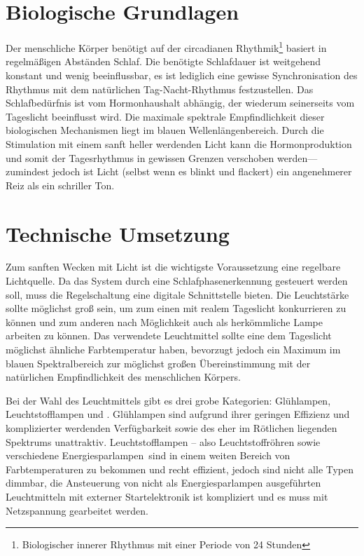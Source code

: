 \documentclass[12pt,a4paper,notitlepage]{article}
\begin{document}
\section{Biologische Grundlagen}
Der menschliche Körper benötigt auf der circadianen Rhythmik\footnote{Biologischer innerer Rhythmus mit einer Periode von 24 Stunden} basiert in regelmäßigen Abständen Schlaf. Die benötigte Schlafdauer ist weitgehend konstant und wenig beeinflussbar, es ist lediglich eine gewisse Synchronisation des Rhythmus mit dem natürlichen Tag-Nacht-Rhythmus festzustellen. Das Schlafbedürfnis ist vom Hormonhaushalt abhängig\cite{WP9}, der wiederum seinerseits vom Tageslicht beeinflusst wird. Die maximale spektrale Empfindlichkeit dieser biologischen Mechanismen liegt im blauen Wellenlängenbereich.
\cite{WP5, WP6, WP7, WP8}
Durch die Stimulation mit einem sanft heller werdenden Licht kann die Hormonproduktion und somit der Tagesrhythmus in gewissen Grenzen verschoben werden---zumindest jedoch ist Licht (selbst wenn es blinkt und flackert) ein angenehmerer Reiz als ein schriller Ton.

\section{Technische Umsetzung}
Zum sanften Wecken mit Licht ist die wichtigste Voraussetzung eine regelbare Lichtquelle. Da das System durch eine Schlafphasenerkennung gesteuert werden soll, muss die Regelschaltung eine digitale Schnittstelle bieten. Die Leuchtstärke sollte möglichst groß sein, um zum einen mit realem Tageslicht konkurrieren zu können und zum anderen nach Möglichkeit auch als herkömmliche Lampe arbeiten zu können. Das verwendete Leuchtmittel sollte eine dem Tageslicht möglichst ähnliche Farbtemperatur haben, bevorzugt jedoch ein Maximum im blauen Spektralbereich zur möglichst großen Übereinstimmung mit der natürlichen Empfindlichkeit des menschlichen Körpers.

Bei der Wahl des Leuchtmittels gibt es drei grobe Kategorien: Glühlampen, Leuchtstofflampen und . Glühlampen sind aufgrund ihrer geringen Effizienz und komplizierter werdenden Verfügbarkeit sowie des eher im Rötlichen liegenden Spektrums unattraktiv. Leuchtstofflampen -- also Leuchtstoffröhren sowie verschiedene \glqq Energiesparlampen\grqq\ sind in einem weiten Bereich von Farbtemperaturen zu bekommen und recht effizient, jedoch sind nicht alle Typen dimmbar, die Ansteuerung von nicht als Energiesparlampen ausgeführten Leuchtmitteln mit externer Startelektronik ist kompliziert und es muss mit Netzspannung gearbeitet werden.
\end{document}
